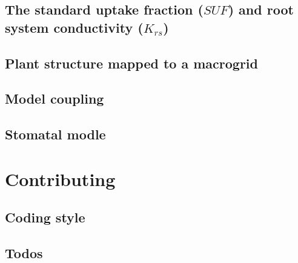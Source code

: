 \documentclass[a4paper]{article}
\begin{document}
\subsection{The standard uptake fraction ($SUF$) and root system conductivity ($K_{rs}$)} \label{ssec:suf}
% 

\subsection{Plant structure mapped to a macrogrid} \label{ssec:mapped}
% 

\subsection{Model coupling} \label{ssec:coupling}
% 

\subsection{Stomatal modle} \label{ssec:stomatal}
% 


\newpage
\section{Contributing} \label{sec:contributing}

\subsection{Coding style} \label{ssec:coding_style}


\subsection{Todos} \label{ssec:todos}





\newpage
 
 
\end{document}
